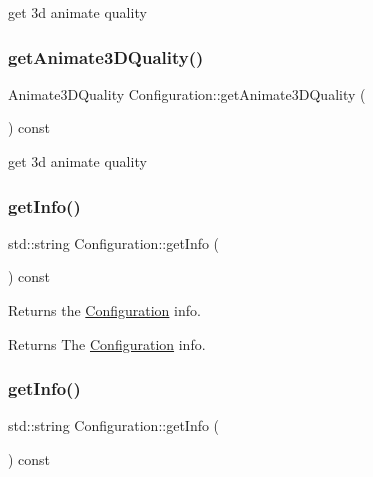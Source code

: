 get 3d animate quality \mbox{\label{classConfiguration_aa7340d160089d9f6de0ebc916740c3c1}} 
\subsubsection{\texorpdfstring{get\+Animate3\+D\+Quality()}{getAnimate3DQuality()}\hspace{0.1cm}{\footnotesize\ttfamily [2/2]}}
{\footnotesize\ttfamily Animate3\+D\+Quality Configuration\+::get\+Animate3\+D\+Quality (\begin{DoxyParamCaption}{ }\end{DoxyParamCaption}) const}

get 3d animate quality \mbox{\label{classConfiguration_ab87bc1959c25c1e1f1887561f52aa0f7}} 
\subsubsection{\texorpdfstring{get\+Info()}{getInfo()}\hspace{0.1cm}{\footnotesize\ttfamily [1/2]}}
{\footnotesize\ttfamily std\+::string Configuration\+::get\+Info (\begin{DoxyParamCaption}{ }\end{DoxyParamCaption}) const}

Returns the \hyperlink{classConfiguration}{Configuration} info.

\begin{DoxyReturn}{Returns}
The \hyperlink{classConfiguration}{Configuration} info. 
\end{DoxyReturn}
\mbox{\label{classConfiguration_ab87bc1959c25c1e1f1887561f52aa0f7}} 
\subsubsection{\texorpdfstring{get\+Info()}{getInfo()}\hspace{0.1cm}{\footnotesize\ttfamily [2/2]}}
{\footnotesize\ttfamily std\+::string Configuration\+::get\+Info (\begin{DoxyParamCaption}{ }\end{DoxyParamCaption}) const}

